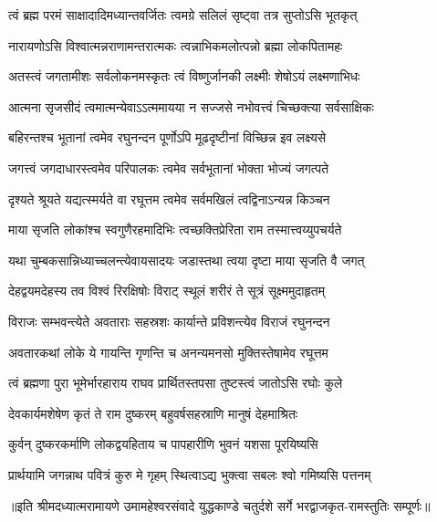 

\addtocounter{shlokacount}{9}

\twolineshloka
{त्वं ब्रह्म परमं साक्षादादिमध्यान्तवर्जितः}
{त्वमग्रे सलिलं सृष्ट्वा तत्र सुप्तोऽसि भूतकृत्} %

\twolineshloka
{नारायणोऽसि विश्वात्मन्नराणामन्तरात्मकः}
{त्वन्नाभिकमलोत्पन्नो ब्रह्मा लोकपितामहः} %

\twolineshloka
{अतस्त्वं जगतामीशः सर्वलोकनमस्कृतः}
{त्वं विष्णुर्जानकी लक्ष्मीः शेषोऽयं लक्ष्मणाभिधः} %

\twolineshloka
{आत्मना सृजसीदं त्वमात्मन्येवाऽऽत्ममायया}
{न सज्जसे नभोवत्त्वं चिच्छक्त्या सर्वसाक्षिकः} %

\twolineshloka
{बहिरन्तश्च भूतानां त्वमेव रघुनन्दन}
{पूर्णोऽपि मूढदृष्टीनां विच्छिन्न इव लक्ष्यसे} %

\twolineshloka
{जगत्त्वं जगदाधारस्त्वमेव परिपालकः}
{त्वमेव सर्वभूतानां भोक्ता भोज्यं जगत्पते} %

\twolineshloka
{दृश्यते श्रूयते यद्यत्स्मर्यते वा रघूत्तम}
{त्वमेव सर्वमखिलं त्वद्विनाऽन्यन्न किञ्चन} %

\twolineshloka
{माया सृजति लोकांश्च स्वगुणैरहमादिभिः}
{त्वच्छक्तिप्रेरिता राम तस्मात्त्वय्युपचर्यते} %

\twolineshloka
{यथा चुम्बकसान्निध्याच्चलन्त्येवायसादयः}
{जडास्तथा त्वया दृष्टा माया सृजति वै जगत्} %

\twolineshloka
{देहद्वयमदेहस्य तव विश्वं रिरक्षिषोः}
{विराट् स्थूलं शरीरं ते सूत्रं सूक्ष्ममुदाहृतम्} %

\twolineshloka
{विराजः सम्भवन्त्येते अवताराः सहस्रशः}
{कार्यान्ते प्रविशन्त्येव विराजं रघुनन्दन} %

\twolineshloka
{अवतारकथां लोके ये गायन्ति गृणन्ति च}
{अनन्यमनसो मुक्तिस्तेषामेव रघूत्तम} %

\twolineshloka
{त्वं ब्रह्मणा पुरा भूमेर्भारहाराय राघव}
{प्रार्थितस्तपसा तुष्टस्त्वं जातोऽसि रघोः कुले} %

\twolineshloka
{देवकार्यमशेषेण कृतं ते राम दुष्करम्}
{बहुवर्षसहस्राणि मानुषं देहमाश्रितः} %

\twolineshloka
{कुर्वन् दुष्करकर्माणि लोकद्वयहिताय च}
{पापहारीणि भुवनं यशसा पूरयिष्यसि} %

\twolineshloka
{प्रार्थयामि जगन्नाथ पवित्रं कुरु मे गृहम्}
{स्थित्वाऽद्य भुक्त्वा सबलः श्वो गमिष्यसि पत्तनम्} %


{॥इति श्रीमदध्यात्मरामायणे उमामहेश्वरसंवादे युद्धकाण्डे चतुर्दशे  सर्गे 
भरद्वाजकृत-रामस्तुतिः सम्पूर्णः॥}
